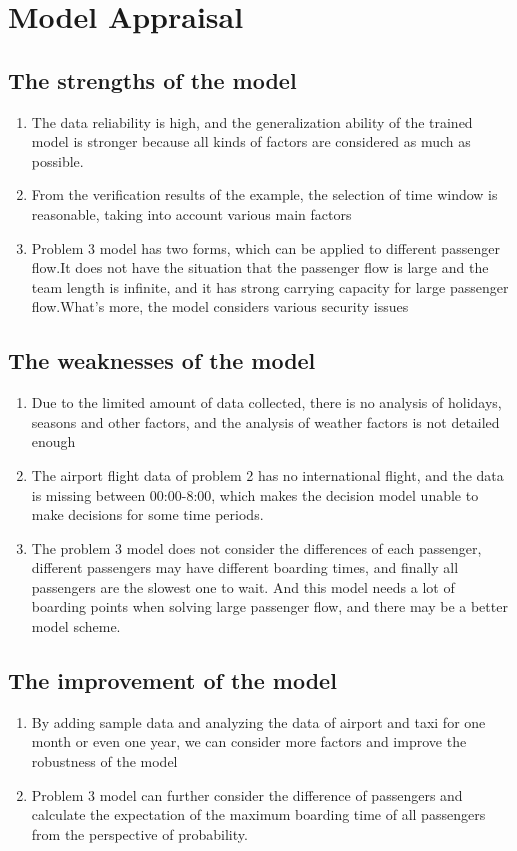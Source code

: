 \section{Model Appraisal}

\subsection{The strengths of the model}
\begin{enumerate}
    \item The data reliability is high, and the generalization ability of the trained model is stronger because all kinds of factors are considered as much as possible.
    \item From the verification results of the example, the selection of time window is reasonable, taking into account various main factors 
    \item Problem 3 model has two forms, which can be applied to different passenger flow.It does not have the situation that the passenger flow is large and the team length is infinite, and it has strong carrying capacity for large passenger flow.What's more, the model considers various security issues
\end{enumerate}

\subsection{The weaknesses of the model}
\begin{enumerate}
    \item Due to the limited amount of data collected, there is no analysis of holidays, seasons and other factors, and the analysis of weather factors is not detailed enough \item The airport flight data of problem 2 has no international flight, and the data is missing between 00:00-8:00, which makes the decision model unable to make decisions for some time periods. 
    \item The problem 3 model does not consider the differences of each passenger, different passengers may have different boarding times, and finally all passengers are the slowest one to wait. And this model needs a lot of boarding points when solving large passenger flow, and there may be a better model scheme.   
\end{enumerate}


\subsection{The improvement of the model}
\begin{enumerate}
    \item By adding sample data and analyzing the data of airport and taxi for one month or even one year, we can consider more factors and improve the robustness of the model \item Problem 3 model can further consider the difference of passengers and calculate the expectation of the maximum boarding time of all passengers from the perspective of probability.
\end{enumerate}

